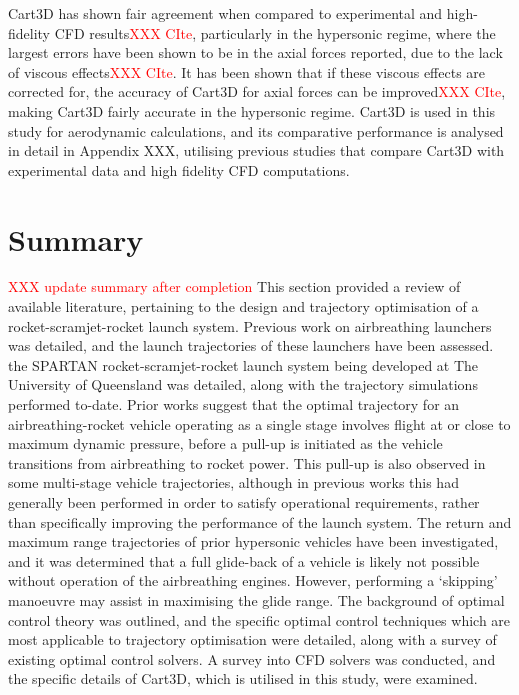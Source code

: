 Cart3D has shown fair agreement when compared to experimental and high-fidelity CFD results\textcolor{red}{XXX CIte}, particularly in the hypersonic regime, where the largest errors have been shown to be in the axial forces reported, due to the lack of viscous effects\textcolor{red}{XXX CIte}. 
It has been shown that if these viscous effects are corrected for, the accuracy of Cart3D for axial forces can be improved\textcolor{red}{XXX CIte}, making Cart3D fairly accurate in the hypersonic regime. Cart3D is used in this study for aerodynamic calculations, and its comparative performance is analysed in detail in Appendix XXX, utilising previous studies that compare Cart3D with experimental data and high fidelity CFD computations. 




      
      \section{Summary}
\textcolor{red}{XXX update summary after completion}
This section provided a review of available literature, pertaining to the design and trajectory optimisation of a rocket-scramjet-rocket launch system.    
       Previous work on airbreathing launchers was detailed, and the launch trajectories of these launchers have been assessed. 
       the SPARTAN rocket-scramjet-rocket launch system being developed at The University of Queensland was detailed, along with the trajectory simulations performed to-date.
       Prior works suggest that the optimal trajectory for an airbreathing-rocket vehicle operating as a single stage involves flight at or close to maximum dynamic pressure, before a pull-up is initiated as the vehicle transitions from airbreathing to rocket power. This pull-up is also observed in some multi-stage vehicle trajectories, although in previous works this had generally been performed in order to satisfy operational requirements, rather than specifically improving the performance of the launch system. 
       The return and maximum range trajectories of prior hypersonic vehicles have been investigated, and it was determined that a full glide-back of a vehicle is likely not possible without operation of the airbreathing engines. However, performing a `skipping' manoeuvre may assist in maximising the glide range. 
The background of optimal control theory was outlined, and the specific optimal control techniques which are most applicable to trajectory optimisation were detailed, along with a survey of existing optimal control solvers. 
A survey into CFD solvers was conducted, and the specific details of Cart3D, which is utilised in this study, were examined. 

